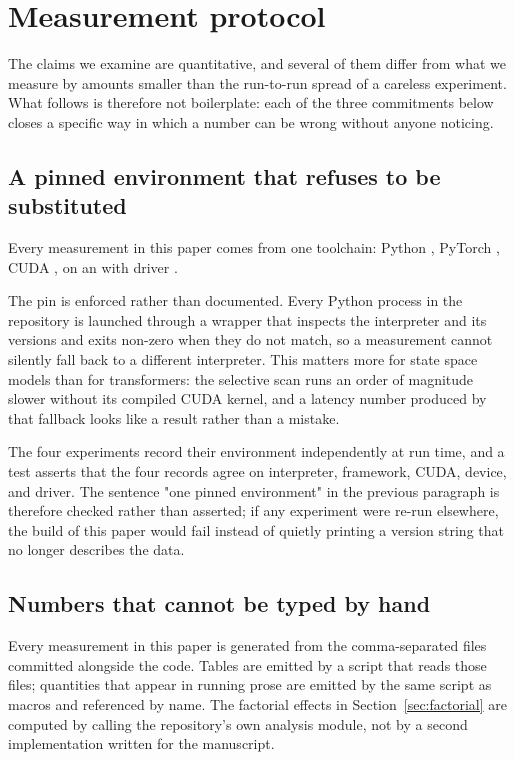\section{Measurement protocol}
\label{sec:protocol}

The claims we examine are quantitative, and several of them differ from what
we measure by amounts smaller than the run-to-run spread of a careless
experiment. What follows is therefore not boilerplate: each of the three
commitments below closes a specific way in which a number can be wrong without
anyone noticing.

\subsection{A pinned environment that refuses to be substituted}

Every measurement in this paper comes from one toolchain: Python
\PyVersion{}, PyTorch \TorchVersion{}, CUDA \CudaVersion{}, on an
\GpuName{} with driver \DriverVersion{}.

The pin is enforced rather than documented. Every Python process in the
repository is launched through a wrapper that inspects the interpreter and
its versions and exits non-zero when they do not match, so a measurement
cannot silently fall back to a different interpreter. This matters more for
state space models than for transformers: the selective scan runs an order of
magnitude slower without its compiled CUDA kernel, and a latency number
produced by that fallback looks like a result rather than a mistake.

The four experiments record their environment independently at run time, and
a test asserts that the four records agree on interpreter, framework, CUDA,
device, and driver. The sentence "one pinned environment" in the previous
paragraph is therefore checked rather than asserted; if any experiment were
re-run elsewhere, the build of this paper would fail instead of quietly
printing a version string that no longer describes the data.

\subsection{Numbers that cannot be typed by hand}

Every measurement in this paper is generated from the comma-separated files
committed alongside the code. Tables are emitted by a script that reads those
files; quantities that appear in running prose are emitted by the same script
as macros and referenced by name. The factorial effects in
Section~\ref{sec:factorial} are computed by calling the repository's own
analysis module, not by a second implementation written for the manuscript.

